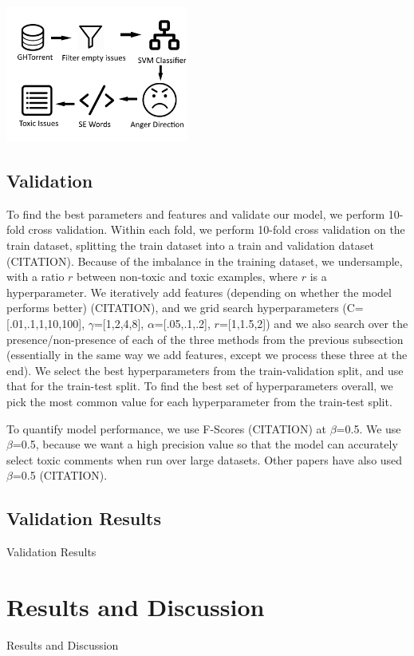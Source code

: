 \documentclass[conference]{IEEEtran}
\begin{document}
\includegraphics[width=6cm]{pipeline.png}


\subsection{Validation} 
To find the best parameters and features and validate our model, we perform 10-fold cross validation. Within each fold, we perform 10-fold cross validation on the train dataset, splitting the train dataset into a train and validation dataset (CITATION). Because of the imbalance in the training dataset, we undersample, with a ratio $r$ between non-toxic and toxic examples, where $r$ is a hyperparameter. We iteratively add features (depending on whether the model performs better) (CITATION), and we grid search hyperparameters (C=[.01,.1,1,10,100], $\gamma$=[1,2,4,8], $\alpha$=[.05,.1,.2], $r$=[1,1.5,2]) and we also search over the presence/non-presence of each of the three methods from the previous subsection (essentially in the same way we add features, except we process these three at the end). We select the best hyperparameters from the train-validation split, and use that for the train-test split. To find the best set of hyperparameters overall, we pick the most common value for each hyperparameter from the train-test split. 

To quantify model performance, we use F-Scores (CITATION) at $\beta$=0.5. We use $\beta$=0.5, because we want a high precision value so that the model can accurately select toxic comments when run over large datasets. Other papers have also used $\beta$=0.5 (CITATION). 

\subsection{Validation Results} 

Validation Results



\section{Results and Discussion}
Results and Discussion
\end{document}
